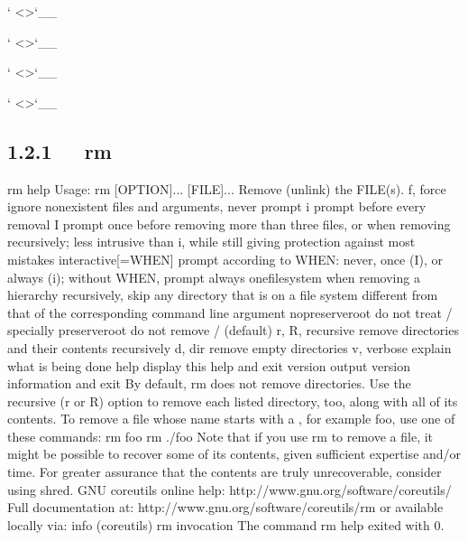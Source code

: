 \documentclass[letterpaper,12pt,english]{sphinxmanual}
\begin{document}
` <>`\_\_

` <>`\_\_

` <>`\_\_

` <>`\_\_


\subsection{1.2.1   rm}
\label{\detokenize{001software/001install/linux:rm}}
\begin{sphinxVerbatim}[commandchars=\\\{\}]
\PYGZdl{} rm \PYGZhy{}\PYGZhy{}help
Usage: rm [OPTION]... [FILE]...
Remove (unlink) the FILE(s).
  \PYGZhy{}f, \PYGZhy{}\PYGZhy{}force           ignore nonexistent files and arguments, never   prompt
  \PYGZhy{}i                    prompt before every removal
  \PYGZhy{}I                    prompt once before removing more than three   files, or
                          when removing recursively; less intrusive than   \PYGZhy{}i,
                          while still giving protection against most   mistakes
      \PYGZhy{}\PYGZhy{}interactive[=WHEN]  prompt according to WHEN: never, once (\PYGZhy{}I),   or
                          always (\PYGZhy{}i); without WHEN, prompt always
      \PYGZhy{}\PYGZhy{}one\PYGZhy{}file\PYGZhy{}system  when removing a hierarchy recursively, skip any
                          directory that is on a file system different   from
                          that of the corresponding command line argument
      \PYGZhy{}\PYGZhy{}no\PYGZhy{}preserve\PYGZhy{}root  do not treat \PYGZsq{}/\PYGZsq{} specially
      \PYGZhy{}\PYGZhy{}preserve\PYGZhy{}root   do not remove \PYGZsq{}/\PYGZsq{} (default)
  \PYGZhy{}r, \PYGZhy{}R, \PYGZhy{}\PYGZhy{}recursive   remove directories and their contents recursively
  \PYGZhy{}d, \PYGZhy{}\PYGZhy{}dir             remove empty directories
  \PYGZhy{}v, \PYGZhy{}\PYGZhy{}verbose         explain what is being done
      \PYGZhy{}\PYGZhy{}help     display this help and exit
      \PYGZhy{}\PYGZhy{}version  output version information and exit
By default, rm does not remove directories.  Use the \PYGZhy{}\PYGZhy{}recursive (\PYGZhy{}r or   \PYGZhy{}R)
option to remove each listed directory, too, along with all of its   contents.
To remove a file whose name starts with a \PYGZsq{}\PYGZhy{}\PYGZsq{}, for example \PYGZsq{}\PYGZhy{}foo\PYGZsq{},
use one of these commands:
  rm \PYGZhy{}\PYGZhy{} \PYGZhy{}foo
  rm ./\PYGZhy{}foo
Note that if you use rm to remove a file, it might be possible to recover
some of its contents, given sufficient expertise and/or time.  For   greater
assurance that the contents are truly unrecoverable, consider using   shred.
GNU coreutils online help: \PYGZlt{}http://www.gnu.org/software/coreutils/\PYGZgt{}
Full documentation at: \PYGZlt{}http://www.gnu.org/software/coreutils/rm\PYGZgt{}
or available locally via: info \PYGZsq{}(coreutils) rm invocation\PYGZsq{}
The command \PYGZdq{}rm \PYGZhy{}\PYGZhy{}help\PYGZdq{} exited with 0.
\end{sphinxVerbatim}
\end{document}
